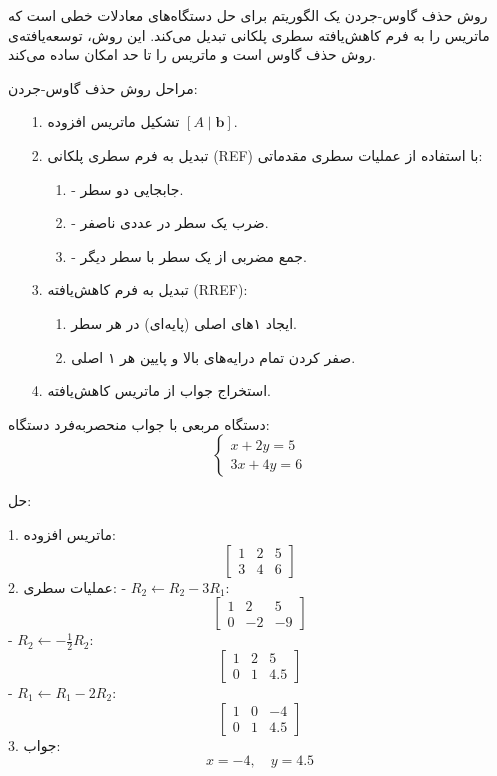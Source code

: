 روش حذف گاوس-جردن یک الگوریتم برای حل دستگاه‌های معادلات خطی است که ماتریس را به فرم کاهش‌یافته سطری پلکانی  تبدیل می‌کند. این روش، توسعه‌یافته‌ی روش حذف گاوس است و ماتریس را تا حد امکان ساده می‌کند.



 مراحل روش حذف گاوس-جردن:
 
 \begin{itemize}
 	\item [1. ]
 	 تشکیل ماتریس افزوده \([A \mid \mathbf{b}]\).
 	\item [2. ]
 	 تبدیل به فرم سطری پلکانی (REF) با استفاده از عملیات سطری مقدماتی:
 	\begin{itemize}
 		\item [1. ]
 		- جابجایی دو سطر.
 		\item [2. ]
 		- ضرب یک سطر در عددی ناصفر.
 		\item [3. ]
 		- جمع مضربی از یک سطر با سطر دیگر.
 		
 	\end{itemize}
 	\item [3. ]
 	 تبدیل به فرم کاهش‌یافته (RREF):
 	\begin{itemize}
 		\item [1. ]
 	ایجاد ۱‌های اصلی (پایه‌ای) در هر سطر.
 		\item [2. ]
صفر کردن تمام درایه‌های بالا و پایین هر ۱ اصلی.
 		
 	\end{itemize}
 	\item [4. ]
 استخراج جواب از ماتریس کاهش‌یافته.
 	
 \end{itemize}


\begin{example}[]
	دستگاه مربعی با جواب منحصربه‌فرد
	دستگاه:
	\[
	\begin{cases}
		x + 2y = 5 \\
		3x + 4y = 6
	\end{cases}
	\]
	
	حل:
	
	
	1. ماتریس افزوده:
	\[
	\left[
	\begin{array}{cc|c}
		1 & 2 & 5 \\
		3 & 4 & 6
	\end{array}
	\right]
	\]
	2. عملیات سطری:
	- \( R_2 \leftarrow R_2 - 3R_1 \):
	\[
	\left[
	\begin{array}{cc|c}
		1 & 2 & 5 \\
		0 & -2 & -9
	\end{array}
	\right]
	\]
	- \( R_2 \leftarrow -\frac{1}{2}R_2 \):
	\[
	\left[
	\begin{array}{cc|c}
		1 & 2 & 5 \\
		0 & 1 & 4.5
	\end{array}
	\right]
	\]
	- \( R_1 \leftarrow R_1 - 2R_2 \):
	\[
	\left[
	\begin{array}{cc|c}
		1 & 0 & -4 \\
		0 & 1 & 4.5
	\end{array}
	\right]
	\]
	3. جواب:
	\[
	x = -4, \quad y = 4.5
	\]
	
\end{example}

